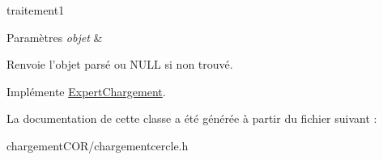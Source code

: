 traitement1 


\begin{DoxyParams}{Paramètres}
{\em objet} & \\
\hline
\end{DoxyParams}
\begin{DoxyReturn}{Renvoie}
l'objet parsé ou N\+U\+L\+L si non trouvé. 
\end{DoxyReturn}


Implémente \hyperlink{class_expert_chargement_a7d7818bdd5f0a06b06bfc8047ec8fee5}{Expert\+Chargement}.



La documentation de cette classe a été générée à partir du fichier suivant \+:\begin{DoxyCompactItemize}
\item 
chargement\+C\+O\+R/chargementcercle.\+h\end{DoxyCompactItemize}
